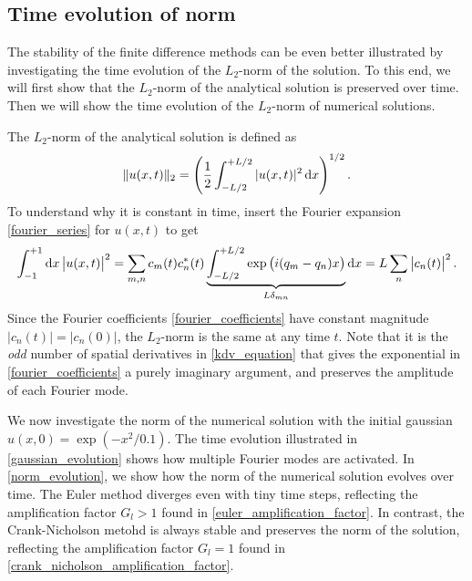 \iffalse
\begin{figure}
\begin{tikzpicture}
\begin{axis}[
	height=10cm, width=1.00\textwidth, xlabel={$x$}, ylabel={$t$}, restrict z to domain=-5:+5, view={-10}{+10}, ymin=0, ymax=1,
]
	\addplot3 [surf, mesh/cols=20] table {exercise4/crank-nicholson-M20-N400.dat};
\end{axis}
\end{tikzpicture}
\end{figure}
\fi

\subsection{Time evolution of norm}


The stability of the finite difference methods can be even better illustrated by investigating the time evolution of the $L_2$-norm of the solution.
To this end, we will first show that the $L_2$-norm of the analytical solution is preserved over time.
Then we will show the time evolution of the $L_2$-norm of numerical solutions.

The $L_2$-norm of the analytical solution is defined as
\begin{equation*}
	\Vert u(x,t) \Vert_2 = \left( \frac{1}{2} \int_{-L/2}^{+L/2} |u(x,t)|^2 \dif x \right)^{1/2}.
\end{equation*}
To understand why it is constant in time, insert the Fourier expansion \cref{fourier_series} for $u(x,t)$ to get
\begin{equation*}
\int_{-1}^{+1} \dif x \left| u(x,t) \right|^2 = \sum_{m,n} c_m(t) c_n^*(t) \underbrace{\int_{-L/2}^{+L/2} \exp{\left(i(q_m-q_n)x\right)}}_{L \delta_{m n}} \dif x = L \sum_n \left| c_n(t) \right|^2.
\end{equation*}
Since the Fourier coefficients \eqref{fourier_coefficients} have constant magnitude $|c_n(t)| = |c_n(0)|$, the $L_2$-norm is the same at any time $t$.
Note that it is the \emph{odd} number of spatial derivatives in \cref{kdv_equation} that gives the exponential in \cref{fourier_coefficients} a purely imaginary argument, and preserves the amplitude of each Fourier mode.

We now investigate the norm of the numerical solution with the initial gaussian $u(x, 0) = \exp \left( -x^2 / 0.1 \right)$.
The time evolution illustrated in \cref{gaussian_evolution} shows how multiple Fourier modes are activated.
In \cref{norm_evolution}, we show how the norm of the numerical solution evolves over time.
The Euler method diverges even with tiny time steps, reflecting the amplification factor $G_l > 1$ found in \cref{euler_amplification_factor}.
In contrast, the Crank-Nicholson metohd is always stable and preserves the norm of the solution, reflecting the amplification factor $G_l = 1$ found in \cref{crank_nicholson_amplification_factor}.


